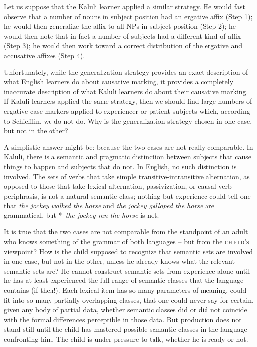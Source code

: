 Let us suppose that the Kaluli learner applied a similar strategy. He would fast observe that a number of nouns in subject position had an ergative affix (Step 1); he would then generalize the affix to all NPs in subject position (Step 2); he would then note that in fact a number of subjects had a different kind of affix (Step 3); he would then work toward a correct distribution of the ergative and accusative affixes (Step 4).

Unfortunately, while the generalization strategy provides an exact description of what English learners do about causative marking, it provides a completely inaccurate description of what Kaluli learners do about their causative marking. If Kaluli learners applied the same strategy, then we should find large numbers of ergative case-markers applied to experiencer or patient subjects which, according to Schiefflin, we do not do. Why is the generalization strategy chosen in one case, but not in the other? 

A simplistic answer might be: because the two cases are not really comparable. In Kaluli, there is a semantic and pragmatic distinction between subjects that cause things to happen and subjects that do not. In English, no such distinction is involved. The sets of verbs that take simple transitive-intransitive alternation, as opposed to those that take lexical alternation, passivization, or causal-verb periphrasis, is not a natural semantic class; nothing but experience could tell one that \textit{the jockey walked the horse} and \textit{the jockey galloped the horse} are grammatical, but *~\textit{the jockey ran the horse} is not.

It is true that the two cases are not comparable from the standpoint of an adult who knows something of the grammar of both languages -- but from the \textsc{chield's} viewpoint? How is the child supposed to recognize that semantic sets are involved in one case, but not in the other, unless he already knows what the relevant semantic sets are? He cannot construct semantic sets from experience alone until he has at least experienced the full range of semantic classes that the language contains (if then!). Each lexical item has so many parameters of mean\-ing, could fit into so many partially overlapping classes, that one could never say for certain, given any body of partial data, whether semantic classes did or did not coincide with the formal differences perceptible in those data. But production does not stand still until the child has mastered possible semantic classes in the language confronting him. The child is under pressure to talk, whether he is ready or not.

